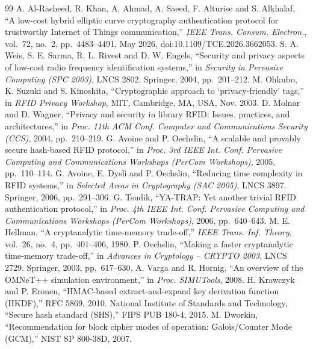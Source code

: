 \clearpage
{}
{}
\renewcommand{\bibname}{References}
\begin{thebibliography}{99}
 A. Al-Rasheed, R. Khan, A. Ahmad, A. Saeed, F. Alturise and S. Alkhalaf, ``A low-cost hybrid elliptic curve cryptography authentication protocol for trustworthy Internet of Things communication,'' \emph{IEEE Trans. Consum. Electron.}, vol.~72, no.~2, pp.~4483--4491, May 2026, doi:10.1109/TCE.2026.3662053.
 S. A. Weis, S. E. Sarma, R. L. Rivest and D. W. Engels, ``Security and privacy aspects of low-cost radio frequency identification systems,'' in \emph{Security in Pervasive Computing (SPC 2003)}, LNCS 2802. Springer, 2004, pp.~201--212.
 M. Ohkubo, K. Suzuki and S. Kinoshita, ``Cryptographic approach to `privacy-friendly' tags,'' in \emph{RFID Privacy Workshop}, MIT, Cambridge, MA, USA, Nov. 2003.
 D. Molnar and D. Wagner, ``Privacy and security in library RFID: Issues, practices, and architectures,'' in \emph{Proc. 11th ACM Conf. Computer and Communications Security (CCS)}, 2004, pp.~210--219.
 G. Avoine and P. Oechslin, ``A scalable and provably secure hash-based RFID protocol,'' in \emph{Proc. 3rd IEEE Int. Conf. Pervasive Computing and Communications Workshops (PerCom Workshops)}, 2005, pp.~110--114.
 G. Avoine, E. Dysli and P. Oechslin, ``Reducing time complexity in RFID systems,'' in \emph{Selected Areas in Cryptography (SAC 2005)}, LNCS 3897. Springer, 2006, pp.~291--306.
 G. Tsudik, ``YA-TRAP: Yet another trivial RFID authentication protocol,'' in \emph{Proc. 4th IEEE Int. Conf. Pervasive Computing and Communications Workshops (PerCom Workshops)}, 2006, pp.~640--643.
 M. E. Hellman, ``A cryptanalytic time-memory trade-off,'' \emph{IEEE Trans. Inf. Theory}, vol.~26, no.~4, pp.~401--406, 1980.
 P. Oechslin, ``Making a faster cryptanalytic time-memory trade-off,'' in \emph{Advances in Cryptology -- CRYPTO 2003}, LNCS 2729. Springer, 2003, pp.~617--630.
 A. Varga and R. Hornig, ``An overview of the OMNeT++ simulation environment,'' in \emph{Proc. SIMUTools}, 2008.
 H. Krawczyk and P. Eronen, ``HMAC-based extract-and-expand key derivation function (HKDF),'' RFC 5869, 2010.
 National Institute of Standards and Technology, ``Secure hash standard (SHS),'' FIPS PUB 180-4, 2015.
 M. Dworkin, ``Recommendation for block cipher modes of operation: Galois/Counter Mode (GCM),'' NIST SP 800-38D, 2007.

\end{thebibliography}
